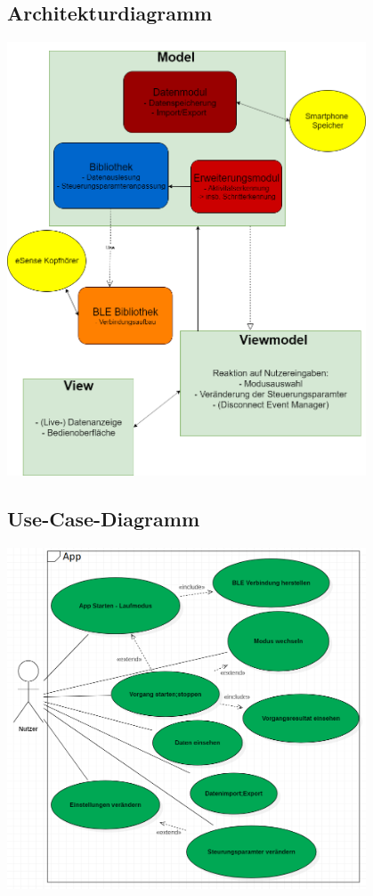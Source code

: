 \documentclass[a4paper,12pt]{article}
\begin{document}
  \subsection{Architekturdiagramm}
  \begin{center}
  	\vspace{100px}
  	\includegraphics[width=0.8\textwidth]{./Diagramme/Archi3.png}
  \end{center}
  
  \subsection{Use-Case-Diagramm}
  \begin{center}
	\includegraphics[width=0.8\textwidth]{./Diagramme/Use-CaseDiagramm.png} 
  \end{center}
\end{document}
